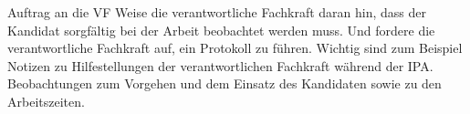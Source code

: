 \begin{taskitemwithoutcomment}{Auftrag an die VF}
  Weise die verantwortliche Fachkraft daran hin, dass der Kandidat sorgfältig bei der Arbeit beobachtet werden muss. Und fordere die verantwortliche Fachkraft auf, ein Protokoll zu führen. Wichtig sind zum Beispiel Notizen zu Hilfestellungen der verantwortlichen Fachkraft während der IPA. Beobachtungen zum Vorgehen und dem Einsatz des Kandidaten sowie zu den Arbeitszeiten.
\end{taskitemwithoutcomment}
